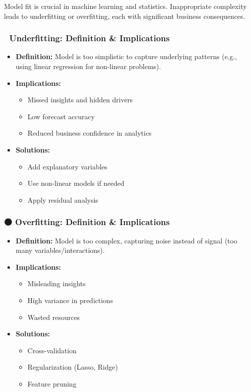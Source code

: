 Model fit is crucial in machine learning and statistics. Inappropriate
complexity leads to underfitting or overfitting, each with significant
business consequences.

\subsubsection{🔵 Underfitting: Definition \&
Implications}\label{underfitting-definition-implications}

\begin{itemize}
\tightlist
\item
  \textbf{Definition:} Model is too simplistic to capture underlying
  patterns (e.g., using linear regression for non-linear problems).
\item
  \textbf{Implications:}

  \begin{itemize}
  \tightlist
  \item
    Missed insights and hidden drivers
  \item
    Low forecast accuracy
  \item
    Reduced business confidence in analytics
  \end{itemize}
\item
  \textbf{Solutions:}

  \begin{itemize}
  \tightlist
  \item
    Add explanatory variables
  \item
    Use non-linear models if needed
  \item
    Apply residual analysis
  \end{itemize}
\end{itemize}

\subsubsection{🟠 Overfitting: Definition \&
Implications}\label{overfitting-definition-implications}

\begin{itemize}
\tightlist
\item
  \textbf{Definition:} Model is too complex, capturing noise instead of
  signal (too many variables/interactions).
\item
  \textbf{Implications:}

  \begin{itemize}
  \tightlist
  \item
    Misleading insights
  \item
    High variance in predictions
  \item
    Wasted resources
  \end{itemize}
\item
  \textbf{Solutions:}

  \begin{itemize}
  \tightlist
  \item
    Cross-validation
  \item
    Regularization (Lasso, Ridge)
  \item
    Feature pruning
  \end{itemize}
\end{itemize}

